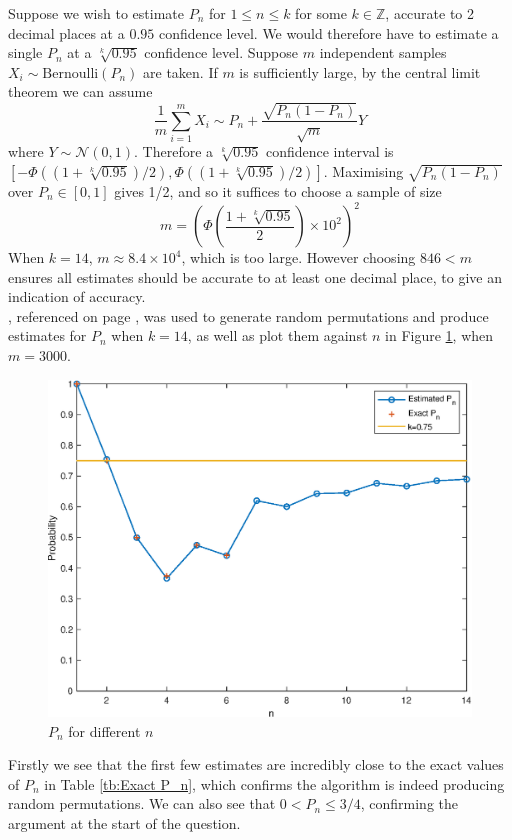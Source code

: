 \documentclass[10pt,a4paper,notitlepage]{article}
\newcommand{\Z}{\mathbb{Z}}
\begin{document}
Suppose we wish to estimate $P_{n}$ for $1\leq n\leq k$ for some $k\in \Z$, accurate to 2 decimal places at a $0.95$ confidence level. We would therefore have to estimate a single $P_{n}$ at a $\sqrt[k]{0.95}$ confidence level. Suppose $m$ independent samples $X_{i}\sim\text{Bernoulli}(P_{n})$ are taken. If $m$ is sufficiently large, by the central limit theorem we can assume 
\begin{equation}
\frac{1}{m}\sum_{i=1}^{m}X_{i}\sim P_{n}+\frac{\sqrt{P_{n}\left(1-P_{n}\right)}}{\sqrt{m}}Y
\end{equation}
where $Y\sim \mathcal{N}(0,1)$. Therefore a $\sqrt[k]{0.95}$ confidence interval is $[-\Phi((1+\sqrt[k]{0.95})/2),\Phi((1+\sqrt[k]{0.95})/2)]$. Maximising $\sqrt{P_{n}(1-P_{n})}$ over $P_{n}\in[0,1]$ gives 1/2, and so it suffices to choose a sample of size
\begin{equation}
m=\left(\Phi\left(\frac{1+\sqrt[k]{0.95}}{2}\right)\times 10^{2}\right)^{2}
\end{equation}
When $k=14$, $m\approx 8.4\times 10^{4}$, which is too large. However choosing $846<m$ ensures all estimates should be accurate to at least one decimal place, to give an indication of accuracy.\\

, referenced on page \pageref{cd:9.2}, was used to generate random permutations and produce estimates for $P_{n}$ when $k=14$, as well as plot them against $n$ in Figure \ref{fg:P_n estimates}, when $m=3000$.
\begin{figure}[H]
\centering
\includegraphics[width=12cm]{Image_1}
\caption{$P_{n}$ for different $n$}\label{fg:P_n estimates}
\end{figure}
Firstly we see that the first few estimates are incredibly close to the exact values of $P_{n}$ in Table \ref{tb:Exact P_n}, which confirms the algorithm is indeed producing random permutations. We can also see that $0<P_{n}\leq 3/4$, confirming the argument at the start of the question. 
\end{document}
